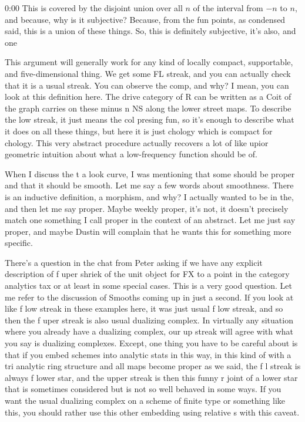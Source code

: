 \begin{unfinished}{0:00}
This is covered by the disjoint union over all $n$ of the interval from $-n$ to $n$, and because, why is it subjective? Because, from the fun points, as condensed said, this is a union of these things. So, this is definitely subjective, it's also, and one

This argument will generally work for any kind of locally compact, supportable, and five-dimensional thing. We get some FL streak, and you can actually check that it is a usual streak. You can observe the comp, and why? I mean, you can look at this definition here. The drive category of R can be written as a Coit of the graph carries on these minus n NS along the lower street maps. To describe the low streak, it just means the col presing fun, so it's enough to describe what it does on all these things, but here it is just chology which is compact for chology. This very abstract procedure actually recovers a lot of like upior geometric intuition about what a low-frequency function should be of.

When I discuss the t a look curve, I was mentioning that some should be proper and that it should be smooth. Let me say a few words about smoothness. There is an inductive definition, a morphism, and why? I actually wanted to be in the, and then let me say proper. Maybe weekly proper, it's not, it doesn't precisely match one something I call proper in the context of an abstract. Let me just say proper, and maybe Dustin will complain that he wants this for something more specific.

There's a question in the chat from Peter asking if we have any explicit description of f uper shriek of the unit object for FX to a point in the category analytics tax or at least in some special cases. This is a very good question. Let me refer to the discussion of Smooths coming up in just a second. If you look at like f low streak in these examples here, it was just usual f low streak, and so then the f uper streak is also usual dualizing complex. In virtually any situation where you already have a dualizing complex, our up streak will agree with what you say is dualizing complexes. Except, one thing you have to be careful about is that if you embed schemes into analytic stats in this way, in this kind of with a tri analytic ring structure and all maps become proper as we said, the f l streak is always f lower star, and the upper streak is then this funny r joint of a lower star that is sometimes considered but is not so well behaved in some ways. If you want the usual dualizing complex on a scheme of finite type or something like this, you should rather use this other embedding using relative s with this caveat.


\end{unfinished}
